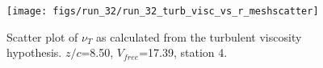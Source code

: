 \begin{figure}[H]
\centering
\texttt{[image: figs/run\_32/run\_32\_turb\_visc\_vs\_r\_meshscatter]}
\caption{Scatter plot of $\nu_T$ as calculated from the turbulent viscosity hypothesis. $z/c$=8.50, $V_{free}$=17.39, station 4.}
\label{fig:run_32_turb_visc_vs_r_meshscatter}
\end{figure}



